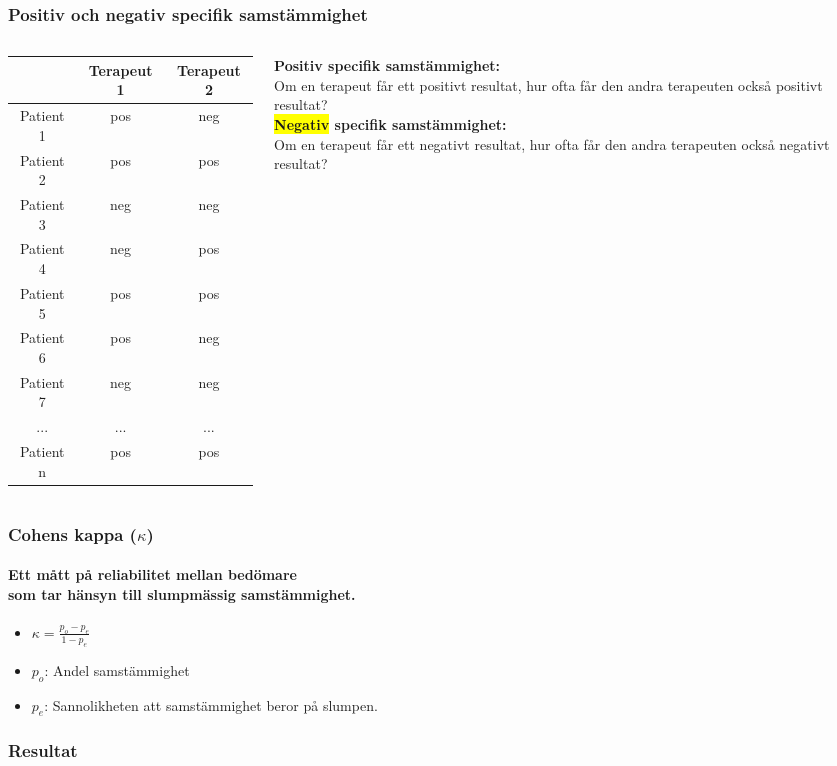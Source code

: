 \documentclass[aspectratio=169,12pt,handout,usenames,dvipsnames]{beamer}
\begin{document}
\begin{frame}
	\frametitle{Positiv och negativ specifik samstämmighet}
	\begin{columns}
		\begin{column}{0.5\textwidth}
			{
				\setlength\extrarowheight{2pt}
				\noindent\begin{tabular}{c|cc}
					& Terapeut 1  & Terapeut 2 \\
					\hline
					Patient 1 &pos&neg\\
					Patient 2 &pos&pos \\
					Patient 3 &\cellcolor{yellow}neg&\cellcolor{yellow}neg\\
					Patient 4 &neg&pos\\
					Patient 5 &pos&pos \\
					Patient 6 &pos&neg\\
					Patient 7 &\cellcolor{yellow}neg&\cellcolor{yellow}neg\\
					... &...&...\\		
					Patient n &pos&pos \\
				\end{tabular}
			}
		\end{column}
		\begin{column}{0.5\textwidth}
			
			{\bfseries Positiv specifik samstämmighet:}\\
			Om en terapeut får ett positivt resultat, hur ofta får den andra terapeuten också positivt resultat?\\[2ex]
			
			{\bfseries \colorbox{yellow}{Negativ} specifik samstämmighet:}\\
			Om en terapeut får ett negativt resultat, hur ofta får den andra terapeuten också negativt resultat?\\[2ex]
			
			
		\end{column}
	\end{columns}
\end{frame}
	
\begin{frame}
	\frametitle{Cohens kappa ($\kappa$)}
	\framesubtitle{Ett mått på reliabilitet mellan bedömare\\ som tar hänsyn till slumpmässig samstämmighet.}
	\begin{itemize}

		\item {\LARGE $\kappa = \frac{p_{o}-p_{e}} {1-p_{e}}$}\\[2ex]
		\item $p_{o}$: Andel samstämmighet
		\item $p_{e}$: Sannolikheten att samstämmighet beror på slumpen.
	\end{itemize}
\end{frame}

\begin{frame}
	\frametitle{Resultat}
	
\end{frame}
\end{document}
